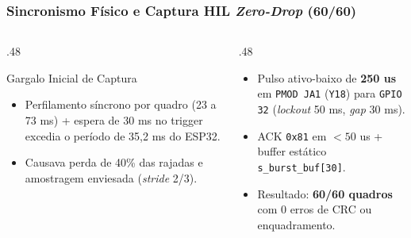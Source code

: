 \begin{frame}
  \frametitle{Sincronismo F\'isico e Captura HIL \textit{Zero-Drop} (60/60)}
  \begin{columns}[T]
    \begin{column}{.48\textwidth}
      \begin{block}{Gargalo Inicial de Captura}
        \begin{itemize}
          \item Perfilamento s\'incrono por quadro (23 a 73 ms) + espera de 30 ms no trigger excedia o per\'iodo de 35,2 ms do ESP32.
          \item Causava perda de 40\% das rajadas e amostragem enviesada (\textit{stride} 2/3).
        \end{itemize}
      \end{block}
    \end{column}
    \begin{column}{.48\textwidth}
      \begin{pontoschave}
        \begin{itemize}
          \item Pulso ativo-baixo de \textbf{250 us} em \texttt{PMOD JA1} (\texttt{Y18}) para \texttt{GPIO 32} (\textit{lockout} 50 ms, \textit{gap} 30 ms).
          \item ACK \texttt{0x81} em $< 50$ us + buffer est\'atico \texttt{s\_burst\_buf[30]}.
          \item Resultado: \textbf{60/60 quadros} com 0 erros de CRC ou enquadramento.
        \end{itemize}
      \end{pontoschave}
    \end{column}
  \end{columns}
\end{frame}
